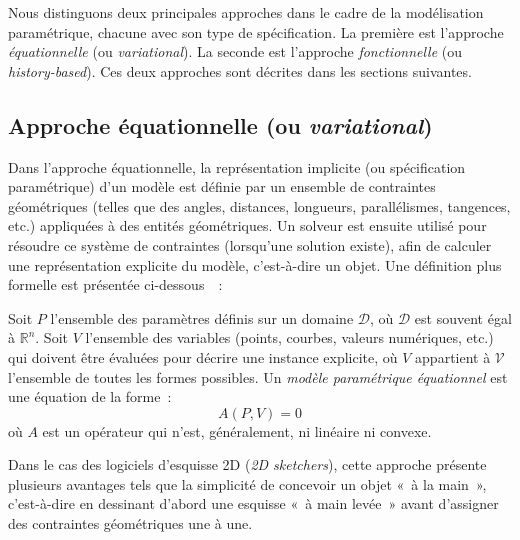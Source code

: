 Nous distinguons deux principales approches dans le cadre de la
modélisation paramétrique, chacune avec son type de
spécification. %
La première est l'approche \emph{équationnelle} (ou \emph{variational}). %
La seconde est l'approche \emph{fonctionnelle} (ou \emph{history-based}). %
Ces deux approches sont décrites dans les sections suivantes.


\subsection{Approche équationnelle (ou \textit{variational})}
\label{sec:etat-art-modelisation-parametric-approche-equationnelle}

Dans l'approche équationnelle, la représentation implicite (ou spécification paramétrique) d'un modèle est définie par un ensemble de contraintes géométriques (telles que des angles, distances, longueurs, parallélismes, tangences, etc.) appliquées à des entités géométriques. Un solveur est ensuite utilisé pour résoudre ce système de contraintes (lorsqu'une solution existe), afin de calculer une représentation explicite du modèle, c'est-à-dire un objet. Une définition plus formelle est présentée ci-dessous~\cite{pierra1996general}~: %

\begin{definition}
	Soit $P$ l'ensemble des paramètres définis sur un domaine $\mathcal{D}$, où
	$\mathcal{D}$ est souvent égal à $\mathbb{R}^{n}$. %
	Soit $V$ l'ensemble des variables (points, courbes, valeurs numériques, etc.) qui doivent être évaluées pour décrire une instance explicite, où $V$ appartient à $\mathcal{V}$ l'ensemble de toutes les formes possibles. Un \emph{modèle paramétrique équationnel} est une équation de la forme~:
	\[ A(P,V) = 0 \] %
	où $A$ est un opérateur qui	n'est, généralement, ni linéaire ni convexe. %
\end{definition}

Dans le cas des logiciels d'esquisse 2D (\textit{2D sketchers}), cette approche
présente plusieurs avantages tels que la simplicité de concevoir un objet «~à la
main~», c'est-à-dire en dessinant d'abord une esquisse «~à main levée~» avant
d'assigner des contraintes géométriques une à une. %

